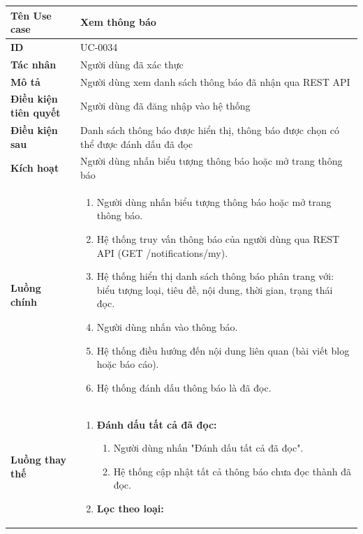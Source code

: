 {
\small
\renewcommand{\arraystretch}{1.15}

\begin{tabularx}{\textwidth}{|>{\raggedright\arraybackslash}p{3.5cm}|>{\raggedright\arraybackslash}X|}
\hline
\textbf{Tên Use case} & Xem thông báo \\
\hline
\textbf{ID} & UC-0034 \\
\hline
\textbf{Tác nhân} & Người dùng đã xác thực \\
\hline
\textbf{Mô tả} & Người dùng xem danh sách thông báo đã nhận qua REST API \\
\hline
\textbf{Điều kiện tiên quyết} & Người dùng đã đăng nhập vào hệ thống \\
\hline
\textbf{Điều kiện sau} & Danh sách thông báo được hiển thị, thông báo được chọn có thể được đánh dấu đã đọc \\
\hline
\textbf{Kích hoạt} & Người dùng nhấn biểu tượng thông báo hoặc mở trang thông báo \\
\hline
\textbf{Luồng chính} &
\begin{enumerate}
    \item Người dùng nhấn biểu tượng thông báo hoặc mở trang thông báo.
    \item Hệ thống truy vấn thông báo của người dùng qua REST API (GET /notifications/my).
    \item Hệ thống hiển thị danh sách thông báo phân trang với: biểu tượng loại, tiêu đề, nội dung, thời gian, trạng thái đọc.
    \item Người dùng nhấn vào thông báo.
    \item Hệ thống điều hướng đến nội dung liên quan (bài viết blog hoặc báo cáo).
    \item Hệ thống đánh dấu thông báo là đã đọc.
\end{enumerate} \\
\hline
\textbf{Luồng thay thế} &
\begin{enumerate}
    \item \textbf{Đánh dấu tất cả đã đọc:}
    \begin{enumerate}
        \item[3A.] Người dùng nhấn "Đánh dấu tất cả đã đọc".
        \item[4A.] Hệ thống cập nhật tất cả thông báo chưa đọc thành đã đọc.
    \end{enumerate}
    \item \textbf{Lọc theo loại:}
    \begin{enumerate}

\end{enumerate}
\end{enumerate}
\end{tabularx}}
